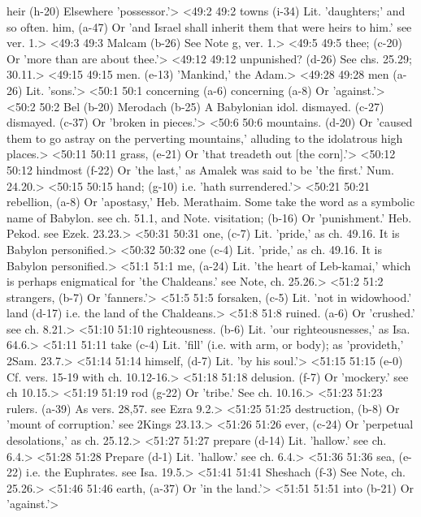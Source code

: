   heir (h-20)  Elsewhere 'possessor.'>
<49:2 49:2  towns (i-34)  Lit. 'daughters;' and so often.
  him, (a-47)  Or 'and Israel shall inherit them that were heirs to him.'  see ver. 1.>
<49:3 49:3  Malcam (b-26)  See Note g, ver. 1.>
<49:5 49:5  thee; (c-20)  Or 'more than are about thee.'>
<49:12 49:12  unpunished? (d-26)  See chs. 25.29; 30.11.>
<49:15 49:15  men. (e-13)  'Mankind,' the Adam.>
<49:28 49:28  men (a-26)  Lit. 'sons.'>
<50:1 50:1  concerning (a-6)  concerning (a-8)
  Or 'against.'>
<50:2 50:2  Bel (b-20)  Merodach (b-25)
  A Babylonian idol.
  dismayed. (c-27)  dismayed. (c-37)
  Or 'broken in pieces.'>
<50:6 50:6  mountains. (d-20)  Or 'caused them to go astray on the perverting mountains,'  alluding to the idolatrous high places.>
<50:11 50:11  grass, (e-21)  Or 'that treadeth out [the corn].'>
<50:12 50:12  hindmost (f-22)  Or 'the last,' as Amalek was said to be 'the first.' Num. 24.20.>
<50:15 50:15  hand; (g-10)  i.e. 'hath surrendered.'>
<50:21 50:21  rebellion, (a-8)  Or 'apostasy,' Heb. Merathaim. Some take the word as a  symbolic name of Babylon. see ch. 51.1, and Note.
  visitation; (b-16)  Or 'punishment.' Heb. Pekod. see Ezek. 23.23.>
<50:31 50:31  one, (c-7) Lit. 'pride,' as ch. 49.16. It is Babylon personified.>
<50:32 50:32  one (c-4)  Lit. 'pride,' as ch. 49.16. It is Babylon personified.>
<51:1 51:1  me, (a-24)  Lit. 'the heart of Leb-kamai,' which is perhaps enigmatical  for 'the Chaldeans.' see Note, ch. 25.26.>
<51:2 51:2  strangers, (b-7)  Or 'fanners.'>
<51:5 51:5  forsaken, (c-5)  Lit. 'not in widowhood.'
  land (d-17)  i.e. the land of the Chaldeans.>
<51:8 51:8  ruined. (a-6)  Or 'crushed.' see ch. 8.21.>
<51:10 51:10  righteousness. (b-6)  Lit. 'our righteousnesses,' as Isa. 64.6.>
<51:11 51:11  take (c-4)  Lit. 'fill' (i.e. with arm, or body); as 'provideth,' 2Sam. 23.7.>
<51:14 51:14  himself, (d-7)  Lit. 'by his soul.'>
<51:15 51:15   (e-0)  Cf. vers. 15-19 with ch. 10.12-16.>
<51:18 51:18  delusion. (f-7)  Or 'mockery.' see ch 10.15.>
<51:19 51:19  rod (g-22)  Or 'tribe.' See ch. 10.16.>
<51:23 51:23  rulers. (a-39)  As vers. 28,57. see Ezra 9.2.>
<51:25 51:25  destruction, (b-8)  Or 'mount of corruption.' see 2Kings 23.13.>
<51:26 51:26  ever, (c-24)  Or 'perpetual desolations,' as ch. 25.12.>
<51:27 51:27  prepare (d-14) Lit. 'hallow.' see ch. 6.4.>
<51:28 51:28  Prepare (d-1)  Lit. 'hallow.' see ch. 6.4.>
<51:36 51:36  sea, (e-22)  i.e. the Euphrates. see Isa. 19.5.>
<51:41 51:41  Sheshach (f-3)  See Note, ch. 25.26.>
<51:46 51:46  earth, (a-37)  Or 'in the land.'>
<51:51 51:51  into (b-21)  Or 'against.'>
